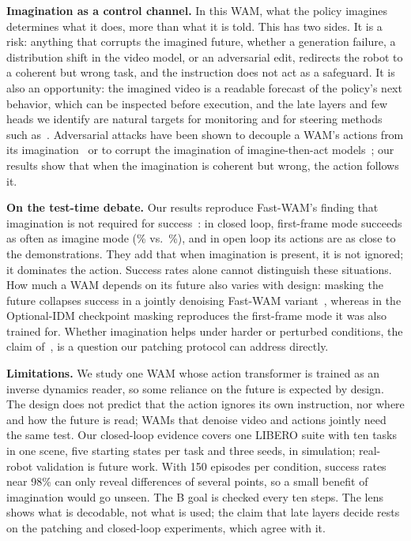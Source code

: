 \documentclass[conference]{IEEEtran}
\begin{document}
\textbf{Imagination as a control channel.} In this WAM, what the policy imagines determines what it does, more than
what it is told. This has two sides. It is a risk: anything that corrupts the imagined future, whether a generation
failure, a distribution shift in the video model, or an adversarial edit, redirects the robot to a coherent but wrong
task, and the instruction does not act as a safeguard. It is also an opportunity: the imagined video is a readable
forecast of the policy's next behavior, which can be inspected before execution, and the late layers and few heads we
identify are natural targets for monitoring and for steering methods such as~\cite{hong2026steering}. Adversarial
attacks have been shown to decouple a WAM's actions from its imagination~\cite{li2026badwam} or to corrupt the
imagination of imagine-then-act models~\cite{chen2026trusted}; our results show that when the imagination is
coherent but wrong, the action follows it.

\textbf{On the test-time debate.} Our results reproduce Fast-WAM's finding that imagination is not required
for success~\cite{yuan2026fastwam}: in closed loop, first-frame mode succeeds as often as imagine mode
(\nNoImgAPooledPct\% vs.\ \nCleanAPooledPct\%), and in open loop its actions are as close to the demonstrations. They add
that when imagination is present, it is not ignored; it dominates the action. Success rates alone cannot distinguish
these situations. How much a WAM depends on its future also varies with design: masking the future collapses success
in a jointly denoising Fast-WAM variant~\cite{zhang2026rift}, whereas in the Optional-IDM checkpoint masking reproduces
the first-frame mode it was also trained for. Whether imagination helps under harder or perturbed conditions, the claim of~\cite{li2026lawa}, is a
question our patching protocol can address directly.

\textbf{Limitations.} We study one WAM whose action transformer is trained as an inverse dynamics reader, so some
reliance on the future is expected by design. The design does not predict that the action ignores its own instruction,
nor where and how the future is read; WAMs that denoise video and actions jointly need the same test. Our closed-loop
evidence covers one LIBERO suite with ten tasks in one scene, five starting states per task and three seeds, in
simulation; real-robot validation is future work. With 150 episodes per condition, success rates near 98\% can only
reveal differences of several points, so a small benefit of imagination would go unseen. The B goal is checked every ten
steps. The lens shows what is decodable, not what is used; the claim that late layers decide rests on the patching and
closed-loop experiments, which agree with it.
\end{document}
